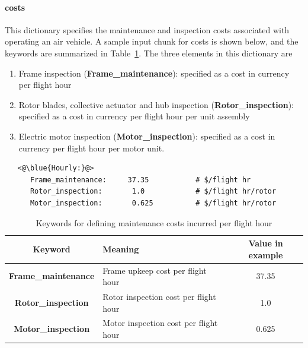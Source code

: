 \paragraph{ costs}
\noindent This dictionary specifies the maintenance and inspection costs associated with operating an air vehicle. A sample input chunk for  costs is shown below, and the keywords are summarized in Table~\ref{tbl:hourly_keywords}. The three elements in this dictionary are 
\begin{enumerate}
\item Frame inspection (\textbf{Frame\_maintenance}): specified as a cost in currency per flight hour
\item Rotor blades, collective actuator and hub inspection (\textbf{Rotor\_inspection}): specified as a cost in currency per flight hour per unit assembly
\item Electric motor inspection (\textbf{Motor\_inspection}): specified as a cost in currency per flight hour per motor unit.
\end{enumerate}

\begin{lstlisting}
   <@\blue{Hourly:}@>
      Frame_maintenance:     37.35           # $/flight hr 
      Rotor_inspection:       1.0            # $/flight hr/rotor 
      Motor_inspection:       0.625          # $/flight hr/rotor 
\end{lstlisting}

\begin{table}[H]
\begin{center}
	\caption{Keywords for defining maintenance costs incurred per flight hour}
	\label{tbl:hourly_keywords}
    \begin{tabular}{| c | l | c |}
    \hline
    Keyword & Meaning & Value in example \\ 
    \hline
\textbf{Frame\_maintenance} & Frame upkeep cost per flight hour &  37.35\\
\textbf{Rotor\_inspection} & Rotor inspection cost per flight hour&  1.0\\
\textbf{Motor\_inspection} & Motor inspection cost per flight hour &  0.625\\
     \hline
  \end{tabular}
\end{center}
\end{table}
\vspace{-1.5cm}
